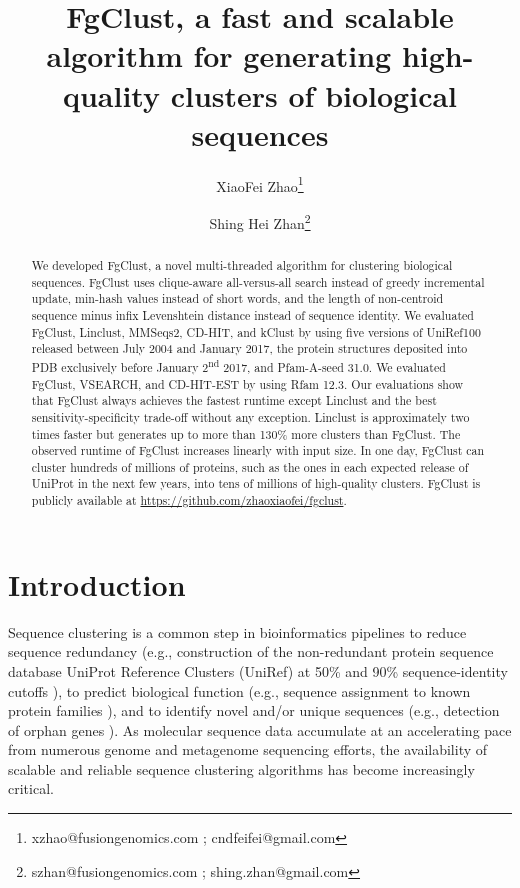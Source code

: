 \documentclass[11pt,letterpaper]{article}
\title{FgClust, a fast and scalable algorithm for generating high-quality clusters of biological sequences}
\author[1]{XiaoFei Zhao\thanks{xzhao@fusiongenomics.com ;  cndfeifei@gmail.com}}
\author[1]{Shing Hei Zhan\thanks{szhan@fusiongenomics.com ; shing.zhan@gmail.com}}
\affil[1]{Fusion Genomics Corporation 
}
\begin{document}
\maketitle

\begin{abstract}
We developed FgClust, a novel multi-threaded algorithm for clustering biological sequences.
FgClust uses clique-aware all-versus-all search instead of greedy incremental update, min-hash values instead of short words, and the length of non-centroid sequence minus infix Levenshtein distance instead of sequence identity.
We evaluated FgClust, Linclust, MMSeqs2, CD-HIT, and kClust by using
five versions of UniRef100 released between July 2004 and January 2017, 
the protein structures deposited into PDB exclusively before January 2\textsuperscript{nd} 2017, and Pfam-A-seed 31.0.
We evaluated FgClust, VSEARCH, and CD-HIT-EST by using Rfam 12.3.
Our evaluations show that FgClust always achieves the fastest runtime except Linclust and the best sensitivity-specificity trade-off without any exception.
Linclust is approximately two times faster but generates up to more than 130\% more clusters than FgClust.
The observed runtime of FgClust increases linearly with input size.
In one day, FgClust can cluster hundreds of millions of proteins, such as the ones in each expected release of UniProt in the next few years, into tens of millions of high-quality clusters.
FgClust is publicly available at \url{https://github.com/zhaoxiaofei/fgclust}.
\end{abstract}

\clearpage{}

\section{Introduction}

Sequence clustering is a common step in bioinformatics pipelines to reduce sequence redundancy (e.g., construction of the non-redundant protein sequence database UniProt Reference Clusters (UniRef) at 50\% and 90\% sequence-identity cutoffs \citep{suzek2007uniref}), to predict biological function (e.g., sequence assignment to known protein families \citep{finn2016pfam}), and to identify novel and/or unique sequences (e.g., detection of orphan genes \citep{prabh2016orphan}). As molecular sequence data accumulate at an accelerating pace from numerous genome and metagenome sequencing efforts, the availability of scalable and reliable sequence clustering algorithms has become increasingly critical.
\end{document}
